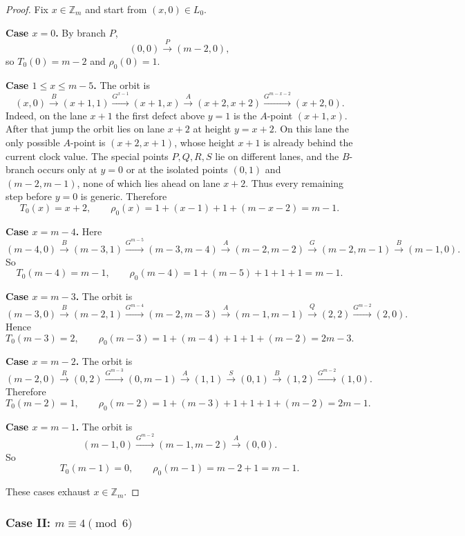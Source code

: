 \documentclass[11pt]{article}
\newcommand{\Zm}{\mathbb Z_m}
\begin{document}
\begin{proof}
Fix $x\in \Zm$ and start from $(x,0)\in L_0$.

\smallskip
\noindent\textbf{Case $x=0$.}
By branch $P$,
\[
(0,0)\xrightarrow{P}(m-2,0),
\]
so $T_0(0)=m-2$ and $\rho_0(0)=1$.

\smallskip
\noindent\textbf{Case $1\le x\le m-5$.}
The orbit is
\[
(x,0)\xrightarrow{B}(x+1,1)\xrightarrow{G^{x-1}}(x+1,x)\xrightarrow{A}(x+2,x+2)
\xrightarrow{G^{m-x-2}}(x+2,0).
\]
Indeed, on the lane $x+1$ the first defect above $y=1$ is the $A$-point $(x+1,x)$.
After that jump the orbit lies on lane $x+2$ at height $y=x+2$.
On this lane the only possible $A$-point is $(x+2,x+1)$, whose height $x+1$ is already behind the current
clock value.
The special points $P,Q,R,S$ lie on different lanes, and the $B$-branch occurs only at $y=0$ or at the
isolated points $(0,1)$ and $(m-2,m-1)$, none of which lies ahead on lane $x+2$.
Thus every remaining step before $y=0$ is generic.
Therefore
\[
T_0(x)=x+2,\qquad
\rho_0(x)=1+(x-1)+1+(m-x-2)=m-1.
\]

\smallskip
\noindent\textbf{Case $x=m-4$.}
Here
\[
(m-4,0)\xrightarrow{B}(m-3,1)\xrightarrow{G^{m-5}}(m-3,m-4)\xrightarrow{A}(m-2,m-2)
\xrightarrow{G}(m-2,m-1)\xrightarrow{B}(m-1,0).
\]
So
\[
T_0(m-4)=m-1,\qquad
\rho_0(m-4)=1+(m-5)+1+1+1=m-1.
\]

\smallskip
\noindent\textbf{Case $x=m-3$.}
The orbit is
\[
(m-3,0)\xrightarrow{B}(m-2,1)\xrightarrow{G^{m-4}}(m-2,m-3)\xrightarrow{A}(m-1,m-1)
\xrightarrow{Q}(2,2)\xrightarrow{G^{m-2}}(2,0).
\]
Hence
\[
T_0(m-3)=2,\qquad
\rho_0(m-3)=1+(m-4)+1+1+(m-2)=2m-3.
\]

\smallskip
\noindent\textbf{Case $x=m-2$.}
The orbit is
\[
(m-2,0)\xrightarrow{R}(0,2)\xrightarrow{G^{m-3}}(0,m-1)\xrightarrow{A}(1,1)\xrightarrow{S}(0,1)
\xrightarrow{B}(1,2)\xrightarrow{G^{m-2}}(1,0).
\]
Therefore
\[
T_0(m-2)=1,\qquad
\rho_0(m-2)=1+(m-3)+1+1+1+(m-2)=2m-1.
\]

\smallskip
\noindent\textbf{Case $x=m-1$.}
The orbit is
\[
(m-1,0)\xrightarrow{G^{m-2}}(m-1,m-2)\xrightarrow{A}(0,0).
\]
So
\[
T_0(m-1)=0,\qquad \rho_0(m-1)=m-2+1=m-1.
\]

These cases exhaust $x\in \Zm$.
\end{proof}

\subsubsection{Case II: $m\equiv 4\pmod 6$}
\end{document}
